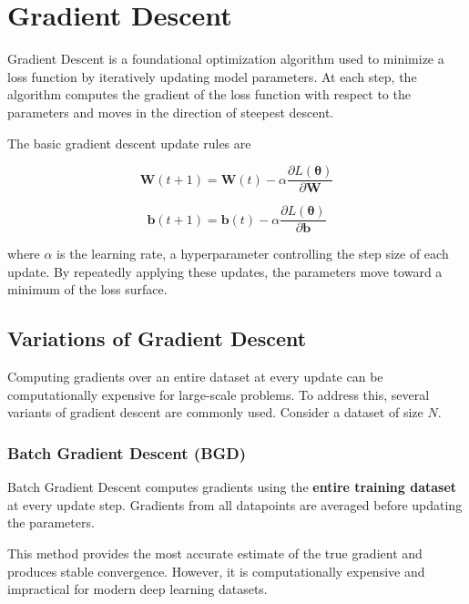 \documentclass{article}
\begin{document}
\section{Gradient Descent}

Gradient Descent is a foundational optimization algorithm used to minimize a loss function by iteratively updating model parameters. At each step, the algorithm computes the gradient of the loss function with respect to the parameters and moves in the direction of steepest descent.

The basic gradient descent update rules are

\begin{equation}
    \mathbf{W}(t+1) = \mathbf{W}(t) - \alpha
    \frac{\partial L(\boldsymbol{\theta})}{\partial \mathbf{W}}
\end{equation}

\begin{equation}
    \mathbf{b}(t+1) = \mathbf{b}(t) - \alpha
    \frac{\partial L(\boldsymbol{\theta})}{\partial \mathbf{b}}
\end{equation}

\noindent where \( \alpha \) is the learning rate, a hyperparameter controlling the step size of each update. By repeatedly applying these updates, the parameters move toward a minimum of the loss surface.

\subsection{Variations of Gradient Descent}

Computing gradients over an entire dataset at every update can be computationally expensive for large-scale problems. To address this, several variants of gradient descent are commonly used. Consider a dataset of size \(N\).

\subsubsection{Batch Gradient Descent (BGD)}

Batch Gradient Descent computes gradients using the \textbf{entire training dataset} at every update step. Gradients from all datapoints are averaged before updating the parameters.

This method provides the most accurate estimate of the true gradient and produces stable convergence. However, it is computationally expensive and impractical for modern deep learning datasets.
\end{document}
